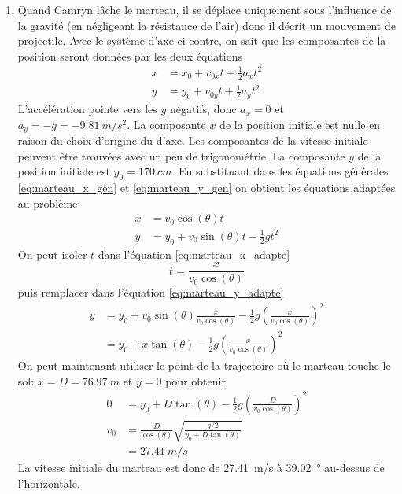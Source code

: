 \documentclass[nofonts]{tufte-handout}
\begin{document}
\begin{enumerate}[label=\alph*)]
  \item Quand Camryn lâche le marteau, il se déplace uniquement sous l'influence
    de la gravité (en négligeant la résistance de l'air) donc il décrit un
    mouvement de projectile. Avec le système d'axe ci-contre, on sait que les
    composantes de la position seront données par les deux équations
    \begin{align}
      x &= x_0 + v_{0x} t + \frac{1}{2} a_x t^2  \label{eq:marteau_x_gen}\\
      y &= y_0 + v_{0y} t + \frac{1}{2} a_y t^2  \label{eq:marteau_y_gen}
    \end{align}
    L'accélération pointe vers les $y$ négatifs, donc $a_x = 0$ et $a_y = -g =
    -\qty{9.81}{m/s^2}$. La composante
    $x$ de la position initiale est nulle en raison du choix d'origine du
    d'axe. Les composantes de la vitesse initiale peuvent être trouvées avec un
    peu de trigonométrie. La composante $y$ de la position initiale est $y_0 =
    \qty{170}{cm}$. En substituant dans les équations générales
    \ref{eq:marteau_x_gen} et \ref{eq:marteau_y_gen} on obtient les équations
    adaptées au problème
    \begin{align}
      x &= v_{0}\cos(\theta) t  \label{eq:marteau_x_adapte}\\
      y &= y_0 + v_{0}\sin(\theta) t - \frac{1}{2} g t^2  \label{eq:marteau_y_adapte}
    \end{align}
    On peut isoler $t$ dans l'équation \ref{eq:marteau_x_adapte}
    \begin{equation}
      t = \frac{x}{v_0 \cos(\theta)}
    \end{equation}
    puis remplacer dans l'équation \ref{eq:marteau_y_adapte} 
    \begin{align}
      y &= y_0 + v_{0}\sin(\theta) \frac{x}{v_0 \cos(\theta)} - \frac{1}{2} g
           \left( \frac{x}{v_0 \cos(\theta)} \right) ^2  \\
        &= y_0 + x \tan(\theta)  - \frac{1}{2} g
           \left( \frac{x}{v_0 \cos(\theta)} \right) ^2
    \end{align}
    On peut maintenant utiliser le point de la trajectoire où le marteau touche
    le sol: $x = D = \qty{76.97}{m}$ et $y = 0$ pour obtenir
    \begin{align}
      0 &= y_0 + D \tan(\theta)  - \frac{1}{2} g
           \left( \frac{D}{v_0 \cos(\theta)} \right) ^2  \\
      v_0 &= \frac{D}{\cos(\theta)} \sqrt{
        \frac{g/2}{y_0 + D\tan(\theta)}
      }  \\
        &= \qty{27.41}{m/s}  \nonumber
    \end{align}
    La vitesse initiale du marteau est donc de \qty{27.41}{m/s} à
    \qty{39.02}{\degree} au-dessus de l'horizontale.


\end{enumerate}
\end{document}
